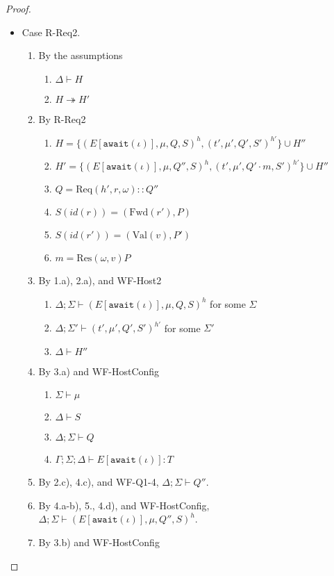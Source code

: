 \documentclass{article}
\theoremstyle{definition}
\newcommand{\Req}[3]{\text{Req}(#1, #2, #3)}
\newcommand{\Res}[2]{\text{Res}(#1, #2)}
\newcommand{\Val}[1]{\text{Val}(#1)}
\newcommand{\Fwd}[1]{\text{Fwd}(#1)}
\begin{document}
\begin{proof}
\begin{itemize}
\item Case R-Req2.
\begin{enumerate}
\item By the assumptions
  \begin{enumerate}[label=(\alph*)]
  \item $\Delta \vdash H$
  \item $H \twoheadrightarrow H'$
  \end{enumerate}
\item By R-Req2
  \begin{enumerate}[label=(\alph*)]
  \item $H = \{ (E[\texttt{await}(\iota)], \mu, Q, S)^h, (t', \mu', Q', S')^{h'} \} \cup H''$
  \item $H' = \{ (E[\texttt{await}(\iota)], \mu, Q'', S)^h, (t', \mu', Q' \cdot m, S')^{h'} \} \cup H''$
  \item $Q         = {\Req {h'} r \omega} :: Q''$
  \item $S(id(r))  = (\Fwd{r'}, P)$
  \item $S(id(r')) = (\Val{v}, P')$
  \item $m         = {\Res \omega v P}$
  \end{enumerate}
\item By 1.a), 2.a), and WF-Host2
  \begin{enumerate}[label=(\alph*)]
  \item $\Delta ; \Sigma \vdash (E[\texttt{await}(\iota)], \mu, Q, S)^h$ for some $\Sigma$
  \item $\Delta ; \Sigma' \vdash (t', \mu', Q', S')^{h'}$ for some $\Sigma'$
  \item $\Delta \vdash H''$
  \end{enumerate}
\item By 3.a) and WF-HostConfig
  \begin{enumerate}[label=(\alph*)]
  \item $\Sigma \vdash \mu$
  \item $\Delta \vdash S$
  \item $\Delta ; \Sigma \vdash Q$
  \item $\Gamma ; \Sigma ; \Delta \vdash E[\texttt{await}(\iota)] : T$
  \end{enumerate}
\item By 2.c), 4.c), and WF-Q1-4, $\Delta ; \Sigma \vdash Q''$.
\item By 4.a-b), 5., 4.d), and WF-HostConfig, $\Delta ; \Sigma \vdash (E[\texttt{await}(\iota)], \mu, Q'', S)^h$.
\item By 3.b) and WF-HostConfig

\end{enumerate}
\end{itemize}
\end{proof}
\end{document}
